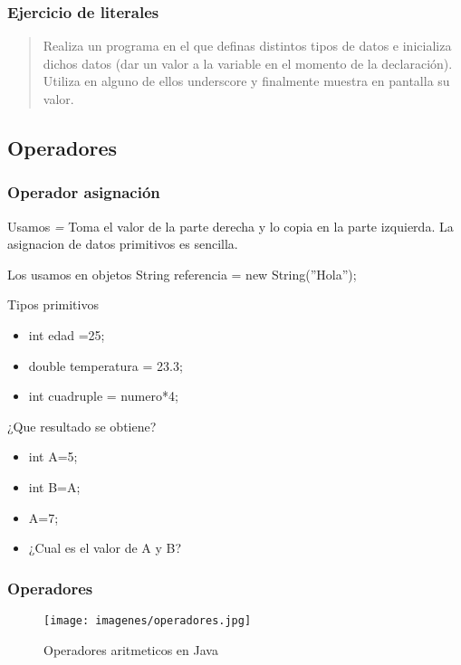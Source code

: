 \documentclass{beamer}
\begin{document}
\begin{frame}

\frametitle{Ejercicio de literales}
\begin{verse}
Realiza un programa en el que definas distintos tipos de datos e inicializa dichos datos (dar un valor a la variable en el momento de la declaración). Utiliza en alguno de ellos underscore y finalmente muestra en pantalla su valor.
\end{verse}
\end{frame}

\subsection{Operadores}

\begin{frame}
    \frametitle{Operador asignación}
    Usamos \emph{=} Toma el valor de la parte derecha y lo copia en la parte izquierda. 	La asignacion de datos primitivos es sencilla.
    \pause
    \begin{footnotesize}
   
	\begin{block}{Los usamos en objetos}
	String referencia = new String(''Hola'');
	\end{block}
	\pause
	\begin{block}{Tipos primitivos}
	\begin{itemize}[<+-|alert@+>]
	\item int edad =25;
	\item double temperatura = 23.3;
	\item int cuadruple = numero*4;
\end{itemize}
	\end{block}
	\pause
	\begin{block}{¿Que resultado se obtiene?}
	\begin{itemize}[<+-|alert@+>]
		\item int A=5;
		\item int B=A;
		\item A=7;
		\item ¿Cual es el valor de A y B?
	\end{itemize}
	
	\end{block}
	 
    \end{footnotesize}
	\pause

\end{frame}

\begin{frame}
    \frametitle{Operadores}
\begin{figure}
\texttt{[image: imagenes/operadores.jpg]} 
\caption{Operadores aritmeticos en Java}
\end{figure}
\end{frame}
\end{document}
